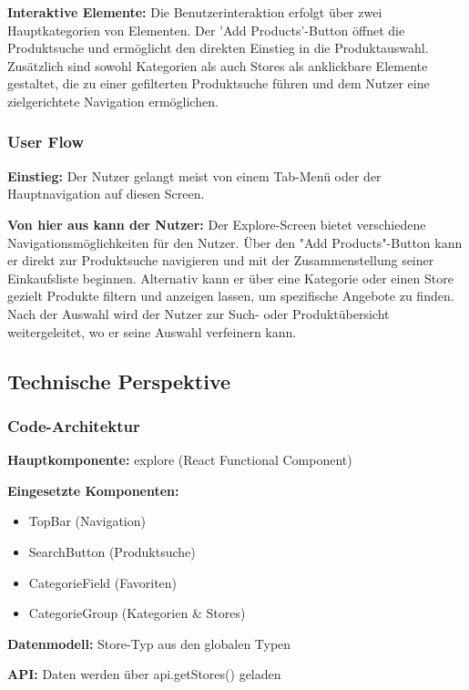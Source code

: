 \noindent\textbf{Interaktive Elemente:}
Die Benutzerinteraktion erfolgt über zwei Hauptkategorien von Elementen. Der 'Add Products'-Button öffnet die Produktsuche und ermöglicht den direkten Einstieg in die Produktauswahl. Zusätzlich sind sowohl Kategorien als auch Stores als anklickbare Elemente gestaltet, die zu einer gefilterten Produktsuche führen und dem Nutzer eine zielgerichtete Navigation ermöglichen.

\subsubsection{User Flow}

\textbf{Einstieg:} Der Nutzer gelangt meist von einem Tab-Menü oder der Hauptnavigation auf diesen Screen.

\noindent\textbf{Von hier aus kann der Nutzer:}
Der Explore-Screen bietet verschiedene Navigationsmöglichkeiten für den Nutzer. Über den "Add Products"-Button kann er direkt zur Produktsuche navigieren und mit der Zusammenstellung seiner Einkaufsliste beginnen. Alternativ kann er über eine Kategorie oder einen Store gezielt Produkte filtern und anzeigen lassen, um spezifische Angebote zu finden. Nach der Auswahl wird der Nutzer zur Such- oder Produktübersicht weitergeleitet, wo er seine Auswahl verfeinern kann.

\subsection{Technische Perspektive}

\subsubsection{Code-Architektur}

\textbf{Hauptkomponente:} explore (React Functional Component)

\noindent\textbf{Eingesetzte Komponenten:}
\begin{itemize}
    \item TopBar (Navigation)
    \item SearchButton (Produktsuche)
    \item CategorieField (Favoriten)
    \item CategorieGroup (Kategorien \& Stores)
\end{itemize}

\noindent\textbf{Datenmodell:} Store-Typ aus den globalen Typen

\noindent\textbf{API:} Daten werden über api.getStores() geladen

